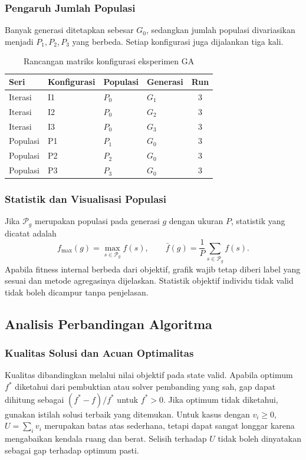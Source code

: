 \subsubsection{Pengaruh Jumlah Populasi}
Banyak generasi ditetapkan sebesar $G_0$, sedangkan jumlah populasi
divariasikan menjadi $P_1,P_2,P_3$ yang berbeda. Setiap konfigurasi juga
dijalankan tiga kali.
\begin{table}[H]\centering\small
\caption{Rancangan matriks konfigurasi eksperimen GA}\label{tab:ga-config}
\begin{tabularx}{\linewidth}{@{}lYYYc@{}}\toprule
Seri & Konfigurasi & Populasi & Generasi & Run\\\midrule
Iterasi & I1 & $P_0$ & $G_1$ & 3\\
Iterasi & I2 & $P_0$ & $G_2$ & 3\\
Iterasi & I3 & $P_0$ & $G_3$ & 3\\
Populasi & P1 & $P_1$ & $G_0$ & 3\\
Populasi & P2 & $P_2$ & $G_0$ & 3\\
Populasi & P3 & $P_3$ & $G_0$ & 3\\\bottomrule
\end{tabularx}\end{table}


\subsubsection{Statistik dan Visualisasi Populasi}
Jika $\mathcal{P}_g$ merupakan populasi pada generasi $g$ dengan ukuran $P$,
statistik yang dicatat adalah
\begin{equation}
 f_{\max}(g)=\max_{s\in\mathcal{P}_g} f(s),\qquad
 \bar f(g)=\frac{1}{P}\sum_{s\in\mathcal{P}_g}f(s).
\end{equation}
Apabila fitness internal berbeda dari objektif, grafik wajib tetap diberi
label yang sesuai dan metode agregasinya dijelaskan. Statistik objektif
individu tidak valid tidak boleh dicampur tanpa penjelasan.




\subsection{Analisis Perbandingan Algoritma}
\subsubsection{Kualitas Solusi dan Acuan Optimalitas}
Kualitas dibandingkan melalui nilai objektif pada state valid. Apabila
optimum $f^*$ diketahui dari pembuktian atau solver pembanding yang sah,
gap dapat dihitung sebagai $(f^*-f)/f^*$ untuk $f^*>0$.
Jika optimum tidak diketahui, gunakan istilah solusi terbaik yang ditemukan.
Untuk kasus dengan $v_i\geq0$, $U=\sum_i v_i$ merupakan batas atas sederhana,
tetapi dapat sangat longgar karena mengabaikan kendala ruang dan berat.
Selisih terhadap $U$ tidak boleh dinyatakan sebagai gap terhadap optimum pasti.


